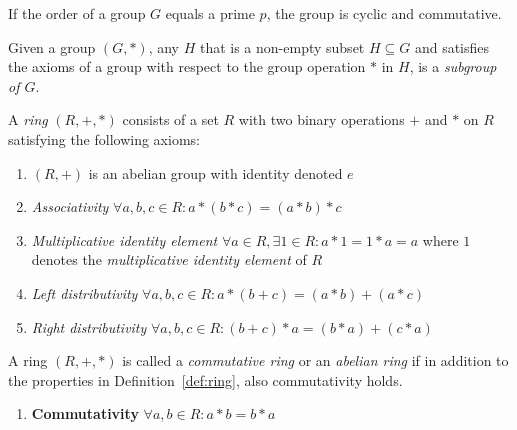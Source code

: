 \begin{thm}
\label{the:group_modulo_a_prime}
If the order of a group $G$ equals a prime $p$, the group is cyclic and commutative.
\end{thm}

\begin{defn}[Subgroup]
\label{def:subgroup}
 Given a group $\left( G, * \right)$, any $H$ that is a non-empty subset $H \subseteq G$ and satisfies the axioms of a group with respect to the group operation $*$ in $H$, is a \textit{subgroup of $G$}.
\end{defn}

\begin{defn}[Ring]
\label{def:ring}
  \setcounter{enumTemp}{\theenumi}
 A \textit{ring} $\left( R, +, * \right)$ consists of a set $R$ with two binary operations $+$ and $*$ on $R$ satisfying the following axioms:
 \begin{enumerate}
  \item $\left( R, + \right)$ is an abelian group with identity denoted $e$
  \item \textit{Associativity} $\forall a, b, c \in R: a*(b*c) = (a*b)*c$
  \item \textit{Multiplicative identity element} $\forall a \in R, \exists 1 \in R: a*1 = 1*a = a $ where $1$ denotes the \textit{multiplicative identity element} of $R$
  \item \textit{Left distributivity} $\forall a, b, c \in R: a*\left( b + c \right) = \left( a * b \right) + \left( a * c \right)$
  \item \textit{Right distributivity} $\forall a, b, c \in R: \left( b + c \right) * a = \left( b * a \right) + \left( c * a \right)$
   \setcounter{enumTemp}{\theenumi}
 \end{enumerate}
\end{defn}

\begin{defn}
 \label{def:commutative_ring}
 A ring $\left( R, +, * \right)$ is called a \textit{commutative ring} or an \textit{abelian ring} if in addition to the properties in Definition~\ref{def:ring}, also commutativity holds.
 \begin{enumerate}
  \setcounter{enumi}{\theenumTemp}
  \item \textbf{Commutativity} $\forall a, b \in R: a*b = b*a$
  \setcounter{enumTemp}{\theenumi}
 \end{enumerate}

\end{defn}

